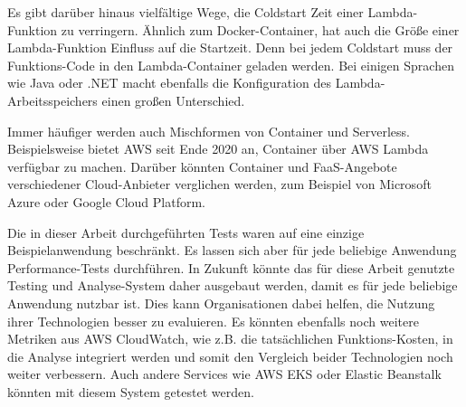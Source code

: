 Es gibt darüber hinaus vielfältige Wege, die Coldstart Zeit einer Lambda-Funktion zu verringern. Ähnlich zum Docker-Container, hat auch die Größe einer Lambda-Funktion Einfluss auf die Startzeit. Denn bei jedem Coldstart muss der Funktions-Code in den Lambda-Container geladen werden. Bei einigen Sprachen wie Java oder .NET macht ebenfalls die Konfiguration des Lambda-Arbeitsspeichers einen großen Unterschied\cite{malishev_aws_2019}. 

Immer häufiger werden auch Mischformen von Container und Serverless. Beispielsweise bietet AWS seit Ende 2020 an, Container über AWS Lambda verfügbar zu machen\cite{noauthor_aws_nodate-1}. Darüber könnten Container und FaaS-Angebote verschiedener Cloud-Anbieter verglichen werden, zum Beispiel von Microsoft Azure oder Google Cloud Platform.

Die in dieser Arbeit durchgeführten Tests waren auf eine einzige Beispielanwendung beschränkt. Es lassen sich aber für jede beliebige Anwendung Performance-Tests durchführen. In Zukunft könnte das für diese Arbeit genutzte Testing und Analyse-System daher ausgebaut werden, damit es für jede beliebige Anwendung nutzbar ist. Dies kann Organisationen dabei helfen, die Nutzung ihrer Technologien besser zu evaluieren. Es könnten ebenfalls noch weitere Metriken aus AWS CloudWatch, wie z.B. die tatsächlichen Funktions-Kosten, in die Analyse integriert werden und somit den Vergleich beider Technologien noch weiter verbessern. Auch andere Services wie AWS EKS oder Elastic Beanstalk könnten mit diesem System getestet werden.

